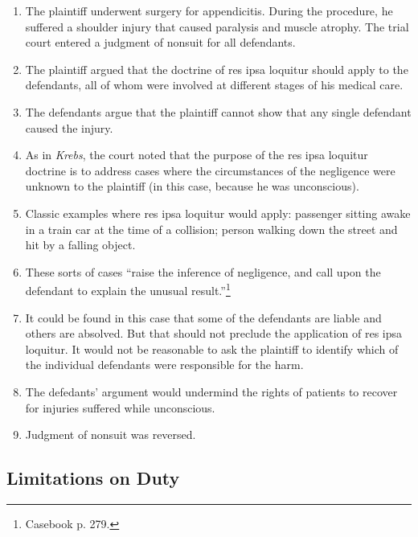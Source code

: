 \begin{enumerate}
    \item The plaintiff underwent surgery for appendicitis. During the procedure, he suffered a shoulder injury that caused paralysis and muscle atrophy. The trial court entered a judgment of nonsuit for all defendants.
    \item The plaintiff argued that the doctrine of res ipsa loquitur should apply to the defendants, all of whom were involved at different stages of his medical care.
    \item The defendants argue that the plaintiff cannot show that any single defendant caused the injury.
    \item As in \emph{Krebs}, the court noted that the purpose of the res ipsa loquitur doctrine is to address cases where the circumstances of the negligence were unknown to the plaintiff (in this case, because he was unconscious).
    \item Classic examples where res ipsa loquitur would apply: passenger sitting awake in a train car at the time of a collision; person walking down the street and hit by a falling object.
    \item These sorts of cases ``raise the inference of negligence, and call upon the defendant to explain the unusual result.''\footnote{Casebook p. 279.}
    \item It could be found in this case that some of the defendants are liable and others are absolved. But that should not preclude the application of res ipsa loquitur. It would not be reasonable to ask the plaintiff to identify which of the individual defendants were responsible for the harm.
    \item The defedants' argument would undermind the rights of patients to recover for injuries suffered while unconscious.
    \item Judgment of nonsuit was reversed.
\end{enumerate}

\subsection{Limitations on Duty}

